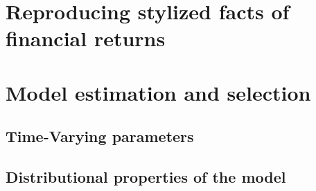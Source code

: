 \newpage

\section{Reproducing stylized facts of financial returns}
\label{Section: Stylized facts}

\section{Model estimation and selection}


\subsection{Time-Varying parameters}

 \subsection{Distributional properties of the model}
 